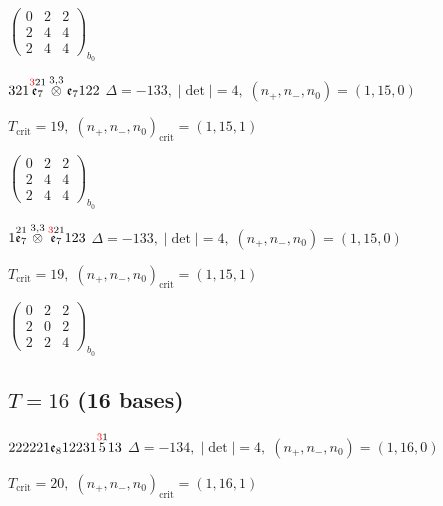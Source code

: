 \documentclass[10pt]{article}
\begin{document}
\hspace{2em}$\left(\begin{smallmatrix}0 & 2 & 2 \\ 2 & 4 & 4 \\ 2 & 4 & 4\end{smallmatrix}\right)_{\!b_0}$

\smallskip

$321\overset{\textcolor{red}{3}21}{\mathfrak{e}_7}\overset{3,3}{\otimes}\mathfrak{e}_7122$ \quad $\Delta=-133,\; |\det|=4,\; (n_+,n_-,n_0)=(1,15,0)$

\hspace{1em}$T_{\text{crit}}=19,\; (n_+,n_-,n_0)_{\text{crit}}=(1,15,1)$

\hspace{2em}$\left(\begin{smallmatrix}0 & 2 & 2 \\ 2 & 4 & 4 \\ 2 & 4 & 4\end{smallmatrix}\right)_{\!b_0}$

\smallskip

$1\overset{21}{\mathfrak{e}_7}\overset{3,3}{\otimes}\overset{\textcolor{red}{3}21}{\mathfrak{e}_7}123$ \quad $\Delta=-133,\; |\det|=4,\; (n_+,n_-,n_0)=(1,15,0)$

\hspace{1em}$T_{\text{crit}}=19,\; (n_+,n_-,n_0)_{\text{crit}}=(1,15,1)$

\hspace{2em}$\left(\begin{smallmatrix}0 & 2 & 2 \\ 2 & 0 & 2 \\ 2 & 2 & 4\end{smallmatrix}\right)_{\!b_0}$


\subsection*{$T = 16$ \quad (16 bases)}
\smallskip

$222221\mathfrak{e}_812231\overset{\textcolor{red}{3}1}{5}13$ \quad $\Delta=-134,\; |\det|=4,\; (n_+,n_-,n_0)=(1,16,0)$

\hspace{1em}$T_{\text{crit}}=20,\; (n_+,n_-,n_0)_{\text{crit}}=(1,16,1)$
\end{document}
